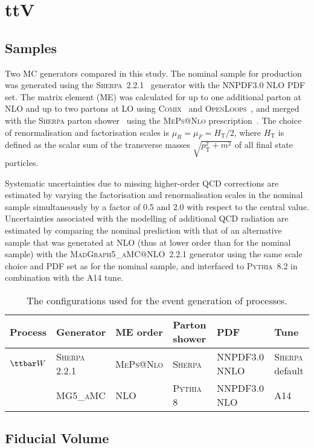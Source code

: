 \section{ttV}
\label{sec:ttV}


\subsection{Samples}
Two MC generators compared in this study.
The nominal sample for \ttW production was generated using the \textsc{Sherpa}~2.2.1~\cite{sherpa} generator with the NNPDF3.0 NLO PDF set.
The matrix element (ME) was calculated for up to one additional parton at NLO and up to two partons at LO using
\textsc{Comix}~\cite{Gleisberg:2008fv} and \textsc{OpenLoops}~\cite{Cascioli:2011va}, and merged with the \textsc{Sherpa} parton shower~\cite{Schumann:2007mg} using the \textsc{MePs@Nlo} prescription~\cite{Hoeche:2012yf}.
The choice of renormalisation and factorisation scales is $\mu_R = \mu_F = H_\textrm{T}$/2, where $H_\textrm{T}$ is defined as the scalar sum of the transverse masses $\sqrt{p_\textrm{T}^2+m^2}$ of all final state particles.



Systematic uncertainties due to missing higher-order QCD corrections are estimated by varying the factorisation and renormalisation scales in the nominal sample simultaneously by a factor of 0.5 and 2.0 with respect to the central value. 
Uncertainties associated with the modelling of additional QCD radiation are estimated by comparing the nominal \ttW prediction with that of an alternative sample that was generated at NLO (thus at lower order than for the nominal sample) with the \textsc{MadGraph5\_aMC@NLO}~2.2.1 generator using the same scale choice and PDF set as for the nominal sample, and interfaced to \textsc{Pythia}~8.2 in combination with the A14 tune. 

\begin{table}
\begin{center}
\caption{\label{tab:mcconfig}
The configurations used for the event generation of \ttW processes.}
\vspace{0.25cm}
{\small
\setlength\tabcolsep{1.5pt}
\begin{tabular}{llllll}
\hline\hline
Process & Generator & ME order & Parton shower & PDF & Tune  \\
\hline
$\ttbar W$  & \textsc{Sherpa 2.2.1} & \textsc{MePs@Nlo} & \textsc{Sherpa} &  NNPDF3.0 NNLO & \textsc{Sherpa} default \\
& \textsc{MG5\_aMC} & NLO & \textsc{Pythia} 8 & NNPDF3.0 NLO & A14   \\
\hline\hline
\end{tabular}
}
\end{center}
\end{table}



\subsection{Fiducial Volume}


